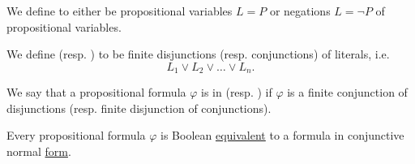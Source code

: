 \begin{definition}\label{def:conjunctive_normal_form}
  We define  to either be propositional variables \( L = P \) or negations \( L = \neg P \) of propositional variables.

  We define  (resp. ) to be finite disjunctions (resp. conjunctions) of literals, i.e.
  \begin{equation*}
    L_1 \lor L_2 \lor \ldots \lor L_n.
  \end{equation*}

  We say that a propositional formula \( \varphi \) is in  (resp. ) if \( \varphi \) is a finite conjunction of disjunctions (resp. finite disjunction of conjunctions).
\end{definition}

\begin{proposition}\label{thm:conjunctive_normal_form_reduction}
  Every propositional formula \( \varphi \) is Boolean \hyperref[def:propositional_interpretation]{equivalent} to a formula in conjunctive normal \hyperref[def:conjunctive_normal_form]{form}.
\end{proposition}

